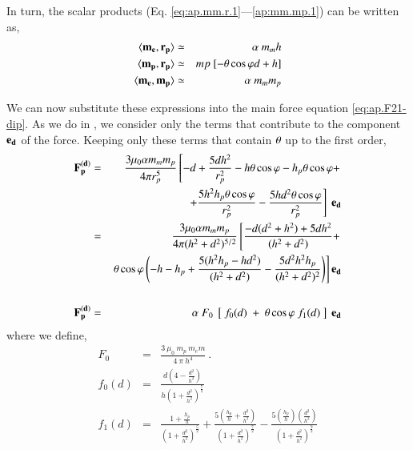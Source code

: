     In turn, the scalar products (Eq. \ref{eq:ap.mm.r.1}---\ref{ap:mm.mp.1}) can be written as,
    \begin{eqnarray}
     \langle\mathbf{m_e},\mathbf{r_{p}}\rangle &\simeq& \alpha \ m_m h \label{eq:ap.mm.r.2}\\
     \langle\mathbf{m_p},\mathbf{r_{p}}\rangle &\simeq& mp \ [-\theta \cos{\varphi} d + h] \label{eq:ap.mp.r.2} \\
     \langle\mathbf{m_e},\mathbf{m_p}\rangle &\simeq&\alpha \ m_m m_p \label{ap:mm.mp.2}
    \end{eqnarray}
    
    We can now substitute these expressions into the main force equation \ref{eq:ap.F21-dip}. As we do in , we consider only the terms that contribute to the component $\mathbf{e_d}$ of the force. Keeping only these terms that contain $\theta$ up to the first order,
     \begin{eqnarray}
     \mathbf{F_{p}^{(d)}} =&& \frac{3\mu _{0} \alpha m_m m_p}{4\pi \Rmagtopen^{5}} \left[-d + \frac{5 d h^2}{\Rmagtopen^2} - h \angt \cphi - h_p \angt \cphi + \right.\nonumber \\
     && \left. + \frac{5 h^2 h_p \angt \cphi}{\Rmagtopen^2} - \frac{5 h d^2 \angt \cphi}{\Rmagtopen^2} \right] \ \ed \\
     =&& \frac{3\mu _{0} \alpha m_m m_p}{4\pi (h^2+d^2)^{5/2}} \left[ \frac{-d (d^2+h^2) +5 d h^2}{(h^2+d^2)} + \right. \nonumber \\
     && \left. \angt \cphi \left( -h -h_p + \frac{5(h^2 h_p - h d^2)}{(h^2+d^2)} - \frac{5 d^2 h^2 h_p}{(h^2+d^2)^2}  \right) \right] \ed \nonumber \\
     && \label{eq:ap.Fp2} \\
      \mathbf{F_{p}^{(d)}} =&& \alpha \ F_0 \ \left[ \ f_0(d) \ + \ \angt \cphi \ f_1(d) \ \right] \ \ed \label{eq:ap.Fd}
     \end{eqnarray}
     \noindent where we define, 
    \begin{eqnarray}
     F_0 &=&  \frac{3 \ \mu_0 \ m_p \ m_em}{4 \ \pi \ h^4} \ . \label{eq:ap.F0}\\
     f_0(d) &=& \frac{d \left(4 - \frac{d^2}{h^2}\right)}{h \left(1 + \frac{d^2}{h^2}\right)^\frac{7}{2}} \label{ap.f_0}\\
     f_1(d) &=& \frac{1 + \frac{h_p}{h}}{\left(1 + \frac{d^2}{h^2} \right)^\frac{5}{2}} 
      + \frac{5 \left(\frac{h_p}{h} + \frac{d^2}{h^2}\right)}{\left(1 + \frac{d^2}{h^2} \right)^\frac{7}{2}} 
      - \frac{5 \left(\frac{h_p}{h}\right) \left(\frac{d^2}{h^2}\right)}{\left(1 + \frac{d^2}{h^2} \right)^\frac{9}{2}} 
    \end{eqnarray}
    
